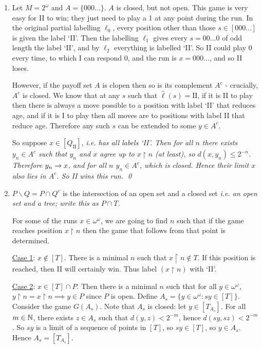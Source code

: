\documentclass[]{article}
\newcommand{\II}{\textrm{II}}
\newcommand{\om}{\omega}
\begin{document}
\begin{enumerate}[label = (\arabic*)]
    \item Let $M = 2^\om$ and $A = \{000\dots\}$. $A$ is closed, but not open. This game is very easy for II to win; they just need to play a 1 at any point during the run. In the original partial labelling $\ell_0$, every position other than those $s \in [000\dots]$ is given the label `II'. Then the labelling $\ell_1$ gives every $s = 00\dots 0$ of odd length the label `II', and by $\ell_2$ everything is labelled `II'. So II could play 0 every time, to which I can respond 0, and the run is $x = 000\dots$, and so II loses.
    
    However, if the payoff set $A$ is clopen then so is its complement $A^c$ - crucially, $A^c$ is closed. We know that at any $s$ such that $\hat{\ell}(s) = \II$, if it is II to play then there is always a move possible to a position with label `II' that reduces age, and if it is I to play then all moves are to positions with label II that reduce age. Therefore any such $s$ can be extended to some $y \in A^c$.
    
    So suppose $x \in [Q_\II]$, \it{i.e.} has all labels `II'. Then for all $n$ there exists $y_n \in A^c$ such that $y_n$ and $x$ agree up to $x\restriction n$ (at least), so $d(x,y_n) \le 2^{-n}$. Therefore $y_n \rightarrow x$, and for all $n$ $y_n\in A^c$, which is closed. Hence their limit $x$ also lies in $A^c$. So II wins this run. \qed


    \item $P\backslash Q = P\cap Q^c$ is the intersection of an open set and a closed set \it{i.e.} an open set and a tree; write this as $P\cap T$.
    
    For some of the runs $x \in \om^\om$, we are going to find $n$ such that if the game reaches position $x\restriction n$ then the game that follows from that point is determined.

    \underline{Case 1}: $x \not \in [T]$. There is a minimal $n$ such that $x\restriction n\not\in T$. If this position is reached, then II will certainly win. Thus label $(x\restriction n)$ with `II'.

    \underline{Case 2}: $x\in [T]\cap P$. Then there is a minimal $n$ such that for all $y \in \om^\om$, $y\restriction n = x\restriction n \implies y \in P$ since $P$ is open. Define $A_s = \{y \in \om^\om : sy \in [T]\}$. Consider the game $G(A_s)$. Note that $A_s$ is closed: let $y \in [T_{A_s}]$. For all $m \in \mathbb{N}$, there exists $z \in A_s$ such that $d(y,z) < 2^{-m}$, hence $d(sy,sz) < 2^{-m}$. So $sy$ is a limit of a sequence of points in $[T]$, so $sy \in [T]$, so $y \in A_s$. Hence $A_s = [T_{A_s}]$.


\end{enumerate}
\end{document}
